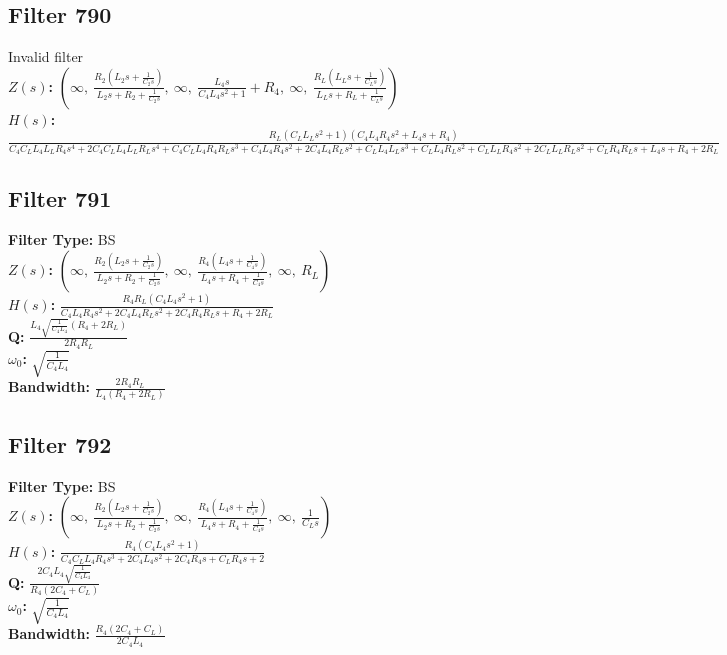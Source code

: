 \documentclass{article}
\begin{document}
\subsection*{Filter 790}
Invalid filter \\ 
\textbf{$Z(s)$:} $\left( \infty, \  \frac{R_{2} \left(L_{2} s + \frac{1}{C_{2} s}\right)}{L_{2} s + R_{2} + \frac{1}{C_{2} s}}, \  \infty, \  \frac{L_{4} s}{C_{4} L_{4} s^{2} + 1} + R_{4}, \  \infty, \  \frac{R_{L} \left(L_{L} s + \frac{1}{C_{L} s}\right)}{L_{L} s + R_{L} + \frac{1}{C_{L} s}}\right)$ \\ 
\textbf{$H(s)$:} $\frac{R_{L} \left(C_{L} L_{L} s^{2} + 1\right) \left(C_{4} L_{4} R_{4} s^{2} + L_{4} s + R_{4}\right)}{C_{4} C_{L} L_{4} L_{L} R_{4} s^{4} + 2 C_{4} C_{L} L_{4} L_{L} R_{L} s^{4} + C_{4} C_{L} L_{4} R_{4} R_{L} s^{3} + C_{4} L_{4} R_{4} s^{2} + 2 C_{4} L_{4} R_{L} s^{2} + C_{L} L_{4} L_{L} s^{3} + C_{L} L_{4} R_{L} s^{2} + C_{L} L_{L} R_{4} s^{2} + 2 C_{L} L_{L} R_{L} s^{2} + C_{L} R_{4} R_{L} s + L_{4} s + R_{4} + 2 R_{L}}$ \\ 
\subsection*{Filter 791}
\textbf{Filter Type:} BS \\ 
\textbf{$Z(s)$:} $\left( \infty, \  \frac{R_{2} \left(L_{2} s + \frac{1}{C_{2} s}\right)}{L_{2} s + R_{2} + \frac{1}{C_{2} s}}, \  \infty, \  \frac{R_{4} \left(L_{4} s + \frac{1}{C_{4} s}\right)}{L_{4} s + R_{4} + \frac{1}{C_{4} s}}, \  \infty, \  R_{L}\right)$ \\ 
\textbf{$H(s)$:} $\frac{R_{4} R_{L} \left(C_{4} L_{4} s^{2} + 1\right)}{C_{4} L_{4} R_{4} s^{2} + 2 C_{4} L_{4} R_{L} s^{2} + 2 C_{4} R_{4} R_{L} s + R_{4} + 2 R_{L}}$ \\ 
\textbf{Q:} $\frac{L_{4} \sqrt{\frac{1}{C_{4} L_{4}}} \left(R_{4} + 2 R_{L}\right)}{2 R_{4} R_{L}}$ \\ 
\textbf{$\omega_0$:} $\sqrt{\frac{1}{C_{4} L_{4}}}$ \\ 
\textbf{Bandwidth:} $\frac{2 R_{4} R_{L}}{L_{4} \left(R_{4} + 2 R_{L}\right)}$ \\ 
\subsection*{Filter 792}
\textbf{Filter Type:} BS \\ 
\textbf{$Z(s)$:} $\left( \infty, \  \frac{R_{2} \left(L_{2} s + \frac{1}{C_{2} s}\right)}{L_{2} s + R_{2} + \frac{1}{C_{2} s}}, \  \infty, \  \frac{R_{4} \left(L_{4} s + \frac{1}{C_{4} s}\right)}{L_{4} s + R_{4} + \frac{1}{C_{4} s}}, \  \infty, \  \frac{1}{C_{L} s}\right)$ \\ 
\textbf{$H(s)$:} $\frac{R_{4} \left(C_{4} L_{4} s^{2} + 1\right)}{C_{4} C_{L} L_{4} R_{4} s^{3} + 2 C_{4} L_{4} s^{2} + 2 C_{4} R_{4} s + C_{L} R_{4} s + 2}$ \\ 
\textbf{Q:} $\frac{2 C_{4} L_{4} \sqrt{\frac{1}{C_{4} L_{4}}}}{R_{4} \left(2 C_{4} + C_{L}\right)}$ \\ 
\textbf{$\omega_0$:} $\sqrt{\frac{1}{C_{4} L_{4}}}$ \\ 
\textbf{Bandwidth:} $\frac{R_{4} \left(2 C_{4} + C_{L}\right)}{2 C_{4} L_{4}}$ \\ 
\end{document}
